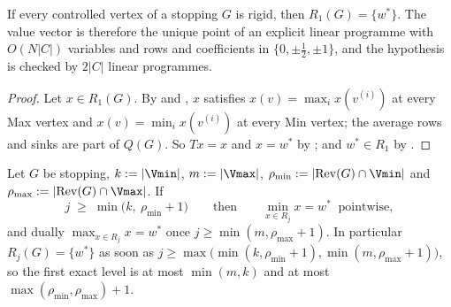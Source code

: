 \begin{theorem}\label{cl:rigid}
If every controlled vertex of a stopping $G$ is rigid, then $R_1(G)=\{w^{\ast}\}$.
The value vector is therefore the unique point of an explicit linear
programme with $O(N|C|)$ variables and rows and coefficients in
$\{0,\pm\frac12,\pm1\}$, and the hypothesis is checked by $2|C|$ linear
programmes.
\end{theorem}

\begin{proof}
Let $x\in R_1(G)$. By  and , $x$ satisfies
$x(v)=\max_i x(v^{(i)})$ at every Max vertex and $x(v)=\min_ix(v^{(i)})$ at
every Min vertex; the average rows and sinks are part of $Q(G)$. So $Tx=x$ and
$x=w^{\ast}$ by ; and $w^{\ast}\in R_1$ by
.
\end{proof}

\begin{theorem}\label{cl:collapse}
Let $G$ be stopping, $k:=|\Vmin|$, $m:=|\Vmax|$,
$\rho_{\min}:=|\mathrm{Rev}(G)\cap\Vmin|$ and $\rho_{\max}:=|\mathrm{Rev}(G)\cap\Vmax|$. If
\[
  j\;\ge\;\min\bigl(k,\ \rho_{\min}+1\bigr)
  \qquad\text{then}\qquad \min_{x\in R_j}x=w^{\ast}\ \text{ pointwise},
\]
and dually $\max_{x\in R_j}x=w^{\ast}$ once
$j\ge\min(m,\rho_{\max}+1)$. In particular $R_j(G)=\{w^{\ast}\}$ as soon as
$j\ge\max\bigl(\min(k,\rho_{\min}+1),\min(m,\rho_{\max}+1)\bigr)$, so the first
exact level is at most $\min(m,k)$ and at most $\max(\rho_{\min},\rho_{\max})+1$.
\end{theorem}

